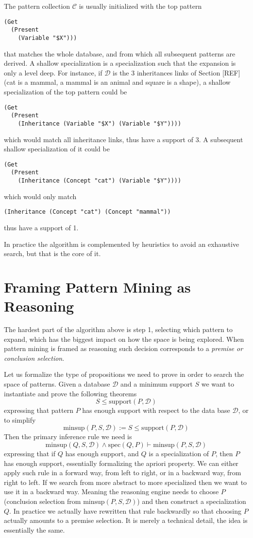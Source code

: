 \documentclass[runningheads]{llncs}
\begin{document}
The pattern collection $\mathcal{C}$ is usually initialized with the
top pattern
\begin{verbatim}
(Get
  (Present
    (Variable "$X")))
\end{verbatim}
that matches the whole database, and from which all subsequent
patterns are derived. A shallow specialization is a specialization
such that the expansion is only a level deep. For instance, if
$\mathcal{D}$ is the 3 inheritances links of Section [REF] (cat is a
mammal, a mammal is an animal and square is a shape), a shallow
specialization of the top pattern could be
\begin{verbatim}
(Get
  (Present
    (Inheritance (Variable "$X") (Variable "$Y"))))
\end{verbatim}
which would match all inheritance links, thus have a support of 3. A
subsequent shallow specialization of it could be
\begin{verbatim}
(Get
  (Present
    (Inheritance (Concept "cat") (Variable "$Y"))))
\end{verbatim}
which would only match
\begin{verbatim}
(Inheritance (Concept "cat") (Concept "mammal"))
\end{verbatim}
thus have a support of 1.

In practice the algorithm is complemented by heuristics to avoid an
exhaustive search, but that is the core of it.

\section{Framing Pattern Mining as Reasoning}

The hardest part of the algorithm above is step 1, selecting which
pattern to expand, which has the biggest impact on how the space is
being explored. When pattern mining is framed as reasoning such
decision corresponds to a \emph{premise or conclusion selection}.

Let us formalize the type of propositions we need to prove in order to
search the space of patterns. Given a database $\mathcal{D}$ and a
minimum support $S$ we want to instantiate and prove the following
theorems
$$ S \le \text{support}(P, \mathcal{D}) $$ expressing that pattern $P$
has enough support with respect to the data base $\mathcal{D}$, or to
simplify
$$ \text{minsup}(P, S, \mathcal{D}) := S \le \text{support}(P,
\mathcal{D}) $$
Then the primary inference rule we need is
$$ \text{minsup}(Q, S, \mathcal{D}) \land \text{spec}(Q, P) \vdash
\text{minsup}(P, S, \mathcal{D})$$ expressing that if $Q$ has enough
support, and $Q$ is a specialization of $P$, then $P$ has enough
support, essentially formalizing the apriori property. We can either
apply such rule in a forward way, from left to right, or in a backward
way, from right to left. If we search from more abstract to more
specialized then we want to use it in a backward way. Meaning the
reasoning engine needs to choose $P$ (conclusion selection from
$\text{minsup}(P, S, \mathcal{D})$) and then construct a
specialization $Q$.  In practice we actually have rewritten that rule
backwardly so that choosing $P$ actually amounts to a premise
selection. It is merely a technical detail, the idea is essentially
the same.
\end{document}
